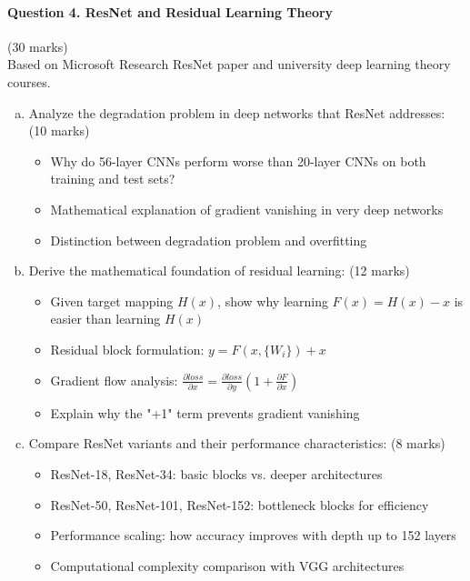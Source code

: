 \documentclass[12pt]{article}
\newcommand{\mediumanswer}{\vspace{3cm}}
\newcommand{\journalspace}{\vspace{4.5cm}}
\begin{document}
\newpage
\paragraph{Question 4. ResNet and Residual Learning Theory}{\hfill (30 marks)}\\
Based on Microsoft Research ResNet paper and university deep learning theory courses.

\begin{enumerate}[(a)]
    \item Analyze the degradation problem in deep networks that ResNet addresses: \hfill (10 marks)
    \begin{itemize}
        \item Why do 56-layer CNNs perform worse than 20-layer CNNs on both training and test sets?
        \item Mathematical explanation of gradient vanishing in very deep networks
        \item Distinction between degradation problem and overfitting
    \end{itemize}
    
    \mediumanswer
    
    \item Derive the mathematical foundation of residual learning: \hfill (12 marks)
    \begin{itemize}
        \item Given target mapping $H(x)$, show why learning $F(x) = H(x) - x$ is easier than learning $H(x)$
        \item Residual block formulation: $y = F(x, \{W_i\}) + x$
        \item Gradient flow analysis: $\frac{\partial loss}{\partial x} = \frac{\partial loss}{\partial y}(1 + \frac{\partial F}{\partial x})$
        \item Explain why the "+1" term prevents gradient vanishing
    \end{itemize}
    
    \journalspace
    
    \item Compare ResNet variants and their performance characteristics: \hfill (8 marks)
    \begin{itemize}
        \item ResNet-18, ResNet-34: basic blocks vs. deeper architectures
        \item ResNet-50, ResNet-101, ResNet-152: bottleneck blocks for efficiency
        \item Performance scaling: how accuracy improves with depth up to 152 layers
        \item Computational complexity comparison with VGG architectures
    \end{itemize}
    
    \mediumanswer
\end{enumerate}
\end{document}
